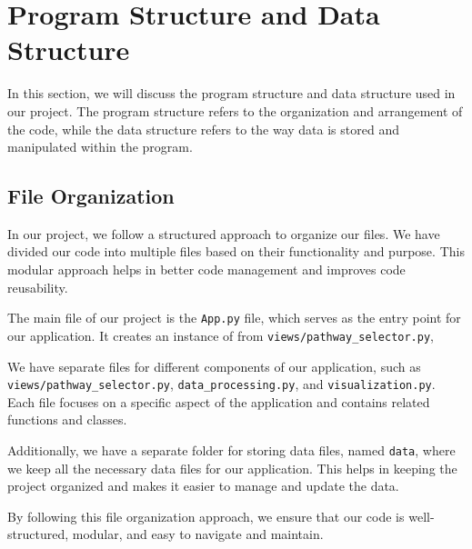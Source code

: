 \section{Program Structure and Data Structure}
\label{sec:program_structure}

In this section, we will discuss the program structure and data structure used in our project. The program structure refers to the organization and arrangement of the code, while the data structure refers to the way data is stored and manipulated within the program.

\subsection{File Organization}
\label{subsec:file_organization}

In our project, we follow a structured approach to organize our files. We have divided our code into multiple files based on their functionality and purpose. This modular approach helps in better code management and improves code reusability.

The main file of our project is the \texttt{App.py} file, which serves as the entry point for our application. It creates an instance of   from \texttt{views/pathway\_selector.py},

We have separate files for different components of our application, such as \texttt{views/pathway\_selector.py}, \texttt{data\_processing.py}, and \texttt{visualization.py}. Each file focuses on a specific aspect of the application and contains related functions and classes.

Additionally, we have a separate folder for storing data files, named \texttt{data}, where we keep all the necessary data files for our application. This helps in keeping the project organized and makes it easier to manage and update the data.

By following this file organization approach, we ensure that our code is well-structured, modular, and easy to navigate and maintain.
